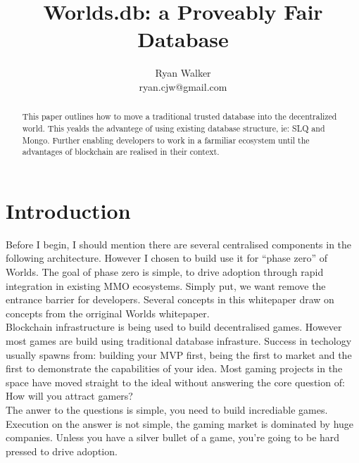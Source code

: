 \documentclass[runningheads,a4paper]{llncs}
\begin{document}
\mainmatter  %

\title{Worlds.db: a Proveably Fair Database}

\author{Ryan Walker\\
				ryan.cjw@gmail.com}

\institute{} %

\maketitle

\begin{abstract}
This paper outlines how to move a traditional trusted database into the
decentralized world. This yealds the advantege of using existing database
structure, ie: SLQ and Mongo. Further enabling developers to work in a farmiliar
ecosystem until the advantages of blockchain are realised in their context.
\end{abstract}

\section{Introduction}
Before I begin, I should mention there are several centralised components in the
following architecture. However I chosen to build use it for ``phase zero'' of
Worlds. The goal of phase zero is simple, to drive adoption through rapid
integration in existing MMO ecosystems. Simply put, we want remove the entrance
barrier for developers. Several concepts in this whitepaper draw on concepts from
the orriginal Worlds whitepaper.
\\

Blockchain infrastructure is being used to build decentralised games. However
most games are build using traditional database infrasture. Success in techology
usually spawns from: building your MVP first, being the first to market and the
first to demonstrate the capabilities of your idea. Most gaming projects in the
space have moved straight to the ideal without answering the core question of:
How will you attract gamers? 
\\


The anwer to the questions is simple, you need to build incrediable games. Execution
on the answer is not simple, the gaming market is dominated by huge companies. Unless
you have a silver bullet of a game, you're going to be hard pressed to drive adoption.
\\
\end{document}
